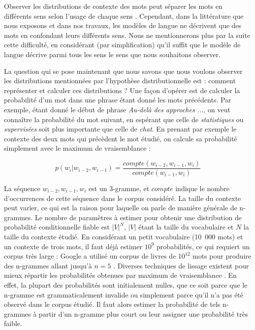 Observer les distributions de contexte des mots peut séparer les mots en
différents sens selon l'usage de chaque sens
\citep{yarowsky1993one,pantel2002discovering,pedersen2010duluth}. Cependant,
dans la littérature que nous exposons et dans nos travaux, les modèles de
langue ne décrivent que des mots en confondant leurs différents sens. Nous ne
mentionnerons plus par la suite cette difficulté, en considérant (par
simplification) qu'il suffit que le modèle de langue décrive parmi tous les
sens le sens que nous souhaitons observer.

La question qui se pose maintenant que nous savons que nous voulons observer
les distributions mentionnées par l'hypothèse distributionnelle est : comment
représenter et calculer ces distributions ? Une façon d'opérer est de calculer
la probabilité d'un mot dans une phrase étant donné les mots précédents. Par
exemple, étant donné le début de phrase \emph{Au-delà des approches ...}, on
veut connaître la probabilité du mot suivant, en espérant que celle de
\emph{statistiques} ou \emph{supervisées} soit plus importante que celle de
\emph{chat}. En prenant par exemple le contexte des deux mots qui précèdent le
mot étudié, on calcule sa probabilité simplement avec le maximum de
vraisemblance :

\[
p(w_i|w_{i-2}, w_{i-1}) = \frac{compte(w_{i-2}, w_{i-1}, w_i)}{compte(w_{i-1}, w_i)}
\]

La séquence $w_{i-2}, w_{i-1}, w_{i}$ est un 3-gramme, et $compte$ indique le
nombre d'occurrences de cette séquence dans le corpus considéré. La taille du
contexte peut varier, ce qui est la raison pour laquelle on parle de manière
générale de n-grammes. Le nombre de paramètres à estimer pour obtenir une
distribution de probabilité conditionnelle fiable est $|V|^N$, $|V|$ étant la
taille du vocabulaire et $N$ la taille du contexte étudié. En considérant un
petit vocabulaire (10~000 mots) et un contexte de trois mots, il faut déjà
estimer $10^{9}$ probabilités, ce qui requiert un corpus très large : Google a
utilisé un corpus de livres de $10^{12}$ mots pour produire des n-grammes
allant jusqu'à $n=5$ \citep{brants2006web}. Diverses techniques de lissage
existent pour mieux répartir les probabilités obtenues par maximum de
vraisemblance \citep[Chapitre~4]{jurafsky2008speech}. En effet, la plupart des
probabilités sont initialement nulles, que ce soit parce que le n-gramme est
grammaticalement invalide ou simplement parce qu'il n'a pas été observé dans le
corpus étudié. Il faut alors estimer la probabilité de tels n-grammes à partir
d'un n-gramme plus court ou leur assigner une probabilité très faible.

